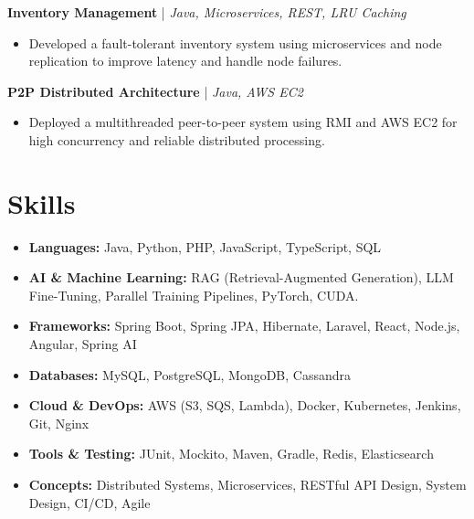 \documentclass[9pt,letterpaper]{extarticle}
\begin{document}
\textbf{Inventory Management} | \textit{Java, Microservices, REST, LRU Caching}
\begin{itemize}[leftmargin=0.15in, noitemsep, topsep=2pt, partopsep=0pt, parsep=0pt]
    \item Developed a fault-tolerant inventory system using microservices and node replication to improve latency and handle node failures.
\end{itemize}

\textbf{P2P Distributed Architecture} | \textit{Java, AWS EC2}
\begin{itemize}[leftmargin=0.15in, noitemsep, topsep=2pt, partopsep=0pt, parsep=0pt]
    \item Deployed a multithreaded peer-to-peer system using RMI and AWS EC2 for high concurrency and reliable distributed processing.
\end{itemize}

\section{Skills}
\begin{itemize}[leftmargin=0.15in, noitemsep, topsep=2pt, partopsep=0pt, parsep=0pt]
    \item \textbf{Languages:} Java, Python, PHP, JavaScript, TypeScript, SQL
    \item \textbf{AI \& Machine Learning:} RAG (Retrieval-Augmented Generation), LLM Fine-Tuning, Parallel Training Pipelines, PyTorch, CUDA.
    \item \textbf{Frameworks:} Spring Boot, Spring JPA, Hibernate, Laravel, React, Node.js, Angular, Spring AI
    \item \textbf{Databases:} MySQL, PostgreSQL, MongoDB, Cassandra
    \item \textbf{Cloud \& DevOps:} AWS (S3, SQS, Lambda), Docker, Kubernetes, Jenkins, Git, Nginx
    \item \textbf{Tools \& Testing:} JUnit, Mockito, Maven, Gradle, Redis, Elasticsearch
    \item \textbf{Concepts:} Distributed Systems, Microservices, RESTful API Design, System Design, CI/CD, Agile
\end{itemize}
\end{document}
